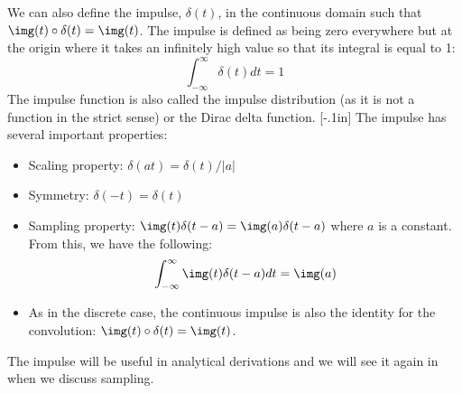 We can also define the impulse, $\delta (t)$, in the continuous domain such that $\img(t) \circ \delta(t) = \img(t)$. The impulse is defined as being zero everywhere but at the origin where it takes an infinitely high value so that its integral is equal to 1:
\begin{equation}
	\int_{-\infty}^{\infty} \delta(t) dt = 1
\end{equation}
The impulse function is also called the impulse distribution (as it is not a function in the strict sense) or the Dirac delta function.
[-.1in]
The impulse has several important properties:
\begin{itemize}
	\item Scaling property: $\delta (at) =  \delta (t) / |a|$
	\item Symmetry: $\delta (-t) = \delta (t)$
	\item Sampling property: $\img (t) \delta (t-a) = \img(a) \delta (t-a)$ where $a$ is a constant. From this, we have the following:
	      \begin{equation}
		      \int_{-\infty}^{\infty} \img (t) \delta (t-a) dt = \img(a)
	      \end{equation}
	\item As in the discrete case, the continuous impulse is also the identity for the convolution: $\img(t) \circ \delta (t) = \img(t)$.
\end{itemize}

The impulse will be useful in analytical derivations and we will see it again in \chap{\ref{chapter:sampling}} when we discuss sampling.

